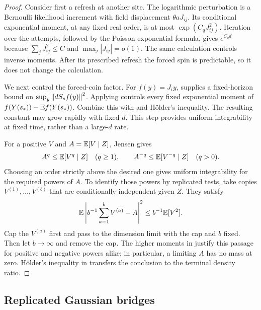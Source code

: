 \begin{proof}
Consider first a refresh at another site.  The logarithmic perturbation
is a Bernoulli likelihood increment with field displacement
$\theta aJ_{ij}$.  Its conditional exponential moment, at any fixed
real order, is at most
$\exp(C_qJ_{ij}^2)$.  Iteration over the attempts, followed by the Poisson
exponential formula, gives $e^{C_qd}$ because
$\sum_jJ_{ij}^2\le C$ and $\max_j|J_{ij}|=o(1)$.  The same calculation controls inverse moments.  After its prescribed
refresh the forced spin is predictable, so it does not change the
calculation.

We next control the forced-coin factor.  For $f(y)=J_iy$,
 supplies a fixed-horizon bound
on $\sup_y\left\lVert dS_sf(y)\right\rVert^2$.  Applying
 controls every fixed exponential moment of
$f(Y(s_*))-\mathbb E f(Y(s_*))$.  Combine this with
 and H\"older's inequality.  The resulting constant may grow rapidly with fixed $d$.  This step
provides uniform integrability at fixed time, rather than a large-$d$
rate.

For a positive $V$ and $A=\mathbb E[V\mid Z]$, Jensen gives
\begin{equation}
 A^q\le\mathbb E[V^q\mid Z]\quad(q\ge1),\qquad
 A^{-q}\le\mathbb E[V^{-q}\mid Z]\quad(q>0).
 \label{eq:row-jensen-ui}
\end{equation}
Choosing an order strictly above the desired one gives uniform
integrability for the required powers of $A$.  To identify those powers
by replicated tests, take copies $V^{(1)},\ldots,V^{(b)}$ that are
conditionally independent given $Z$.  They satisfy
\[
 \mathbb E\left|b^{-1}\sum_{a=1}^bV^{(a)}-A\right|^2
       \le b^{-1}\mathbb E[V^2].
\]
Cap the $V^{(a)}$ first and pass to the dimension limit with the cap
and $b$ fixed.  Then let $b\to\infty$ and remove the cap.  The higher
moments in  justify this passage for positive and
negative powers alike; in particular, a limiting $A$ has no mass at
zero.  H\"older's inequality in  transfers the
conclusion to the terminal density ratio.
\end{proof}

\subsection{Replicated Gaussian bridges}

